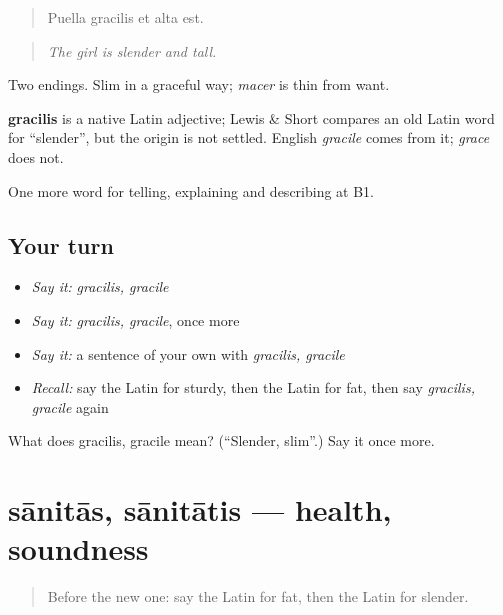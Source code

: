 \begin{quote}
Puella gracilis et alta est.
\end{quote}

\begin{quote}
\emph{The girl is slender and tall.}
\end{quote}

Two endings. Slim in a graceful way; \emph{macer} is thin from want.

\begin{cousinweb}
\textbf{gracilis} is a native Latin adjective; Lewis \& Short compares an old Latin word for \textquotedblleft{}slender\textquotedblright{}, but the origin is not settled. English \emph{gracile} comes from it; \emph{grace} does not.
\end{cousinweb}

\begin{grammarlens}[title={What you've built}]
One more word for telling, explaining and describing at B1.
\end{grammarlens}

\subsection*{Your turn}
\begin{itemize}
\raggedright
  \item \emph{Say it:} \emph{gracilis, gracile}
  \item \emph{Say it:} \emph{gracilis, gracile}, once more
  \item \emph{Say it:} a sentence of your own with \emph{gracilis, gracile}
  \item \emph{Recall:} say the Latin for sturdy, then the Latin for fat, then say \emph{gracilis, gracile} again
\end{itemize}

\begin{tcolorbox}[breakable,colback=teal!4,colframe=teal!35!black,title={Before you move on}]
What does gracilis, gracile mean? (\textquotedblleft{}Slender, slim\textquotedblright{}.) Say it once more.
\end{tcolorbox}
\section[sānitās, sānitātis]{sānitās, sānitātis — health, soundness}

\label{lesson:LA-C523-sanitas}



\begin{quote}
Before the new one: say the Latin for fat, then the Latin for slender.
\end{quote}

